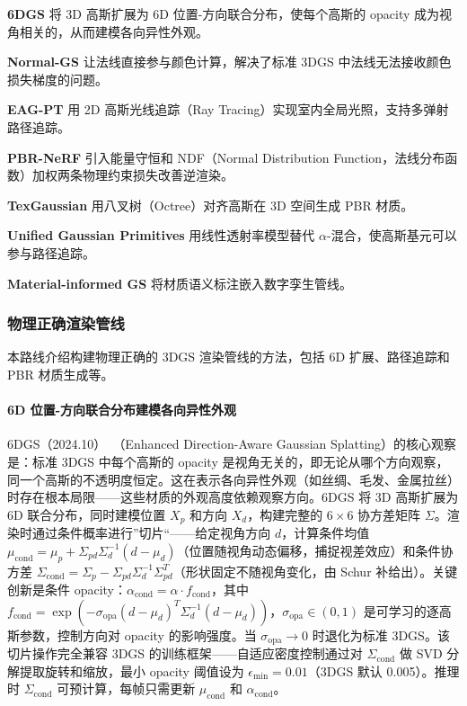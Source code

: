 \textbf{6DGS} 将 3D 高斯扩展为 6D 位置-方向联合分布，使每个高斯的 opacity 成为视角相关的，从而建模各向异性外观。

\textbf{Normal-GS} 让法线直接参与颜色计算，解决了标准 3DGS 中法线无法接收颜色损失梯度的问题。

\textbf{EAG-PT} 用 2D 高斯光线追踪（Ray Tracing）实现室内全局光照，支持多弹射路径追踪。

\textbf{PBR-NeRF} 引入能量守恒和 NDF（Normal Distribution Function，法线分布函数）加权两条物理约束损失改善逆渲染。

\textbf{TexGaussian} 用八叉树（Octree）对齐高斯在 3D 空间生成 PBR 材质。

\textbf{Unified Gaussian Primitives} 用线性透射率模型替代 $\alpha$-混合，使高斯基元可以参与路径追踪。

\textbf{Material-informed GS} 将材质语义标注嵌入数字孪生管线。

\subsubsection{物理正确渲染管线}

本路线介绍构建物理正确的 3DGS 渲染管线的方法，包括 6D 扩展、路径追踪和 PBR 材质生成等。

\paragraph{6D 位置-方向联合分布建模各向异性外观}

6DGS（2024.10）~\cite{2410_04974}（Enhanced Direction-Aware Gaussian Splatting）的核心观察是：标准 3DGS 中每个高斯的 opacity 是视角无关的，即无论从哪个方向观察，同一个高斯的不透明度恒定。这在表示各向异性外观（如丝绸、毛发、金属拉丝）时存在根本局限——这些材质的外观高度依赖观察方向。6DGS 将 3D 高斯扩展为 6D 联合分布，同时建模位置 $X_p$ 和方向 $X_d$，构建完整的 $6 \times 6$ 协方差矩阵 $\Sigma$。渲染时通过条件概率进行”切片“——给定视角方向 $d$，计算条件均值 $\mu_{\text{cond}} = \mu_p + \Sigma_{pd} \Sigma_d^{-1}(d - \mu_d)$（位置随视角动态偏移，捕捉视差效应）和条件协方差 $\Sigma_{\text{cond}} = \Sigma_p - \Sigma_{pd} \Sigma_d^{-1} \Sigma_{pd}^T$（形状固定不随视角变化，由 Schur 补给出）。关键创新是条件 opacity：$\alpha_{\text{cond}} = \alpha \cdot f_{\text{cond}}$，其中 $f_{\text{cond}} = \exp(-\sigma_{\text{opa}} (d - \mu_d)^T \Sigma_d^{-1} (d - \mu_d))$，$\sigma_{\text{opa}} \in (0,1)$ 是可学习的逐高斯参数，控制方向对 opacity 的影响强度。当 $\sigma_{\text{opa}} \to 0$ 时退化为标准 3DGS。该切片操作完全兼容 3DGS 的训练框架——自适应密度控制通过对 $\Sigma_{\text{cond}}$ 做 SVD 分解提取旋转和缩放，最小 opacity 阈值设为 $\epsilon_{\min} = 0.01$（3DGS 默认 0.005）。推理时 $\Sigma_{\text{cond}}$ 可预计算，每帧只需更新 $\mu_{\text{cond}}$ 和 $\alpha_{\text{cond}}$。

